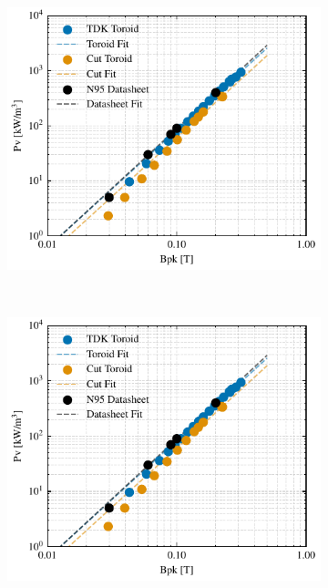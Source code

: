 \documentclass[conference]{IEEEtran}
\begin{document}
\begin{figure}[t]
  \centering
  \begin{subfigure}{\columnwidth}
    \centering
    \includegraphics{figures/24-09-10_BP_curves.pdf}
    \caption{}
    \label{fig:BPcurves}
  \end{subfigure}~
  \begin{subfigure}{\columnwidth}
    \centering
    \includegraphics{figures/24-09-10_BP_curves.pdf}
    \caption{}
    \label{fig:corelossstress}
  \end{subfigure}


\end{figure}
\end{document}

